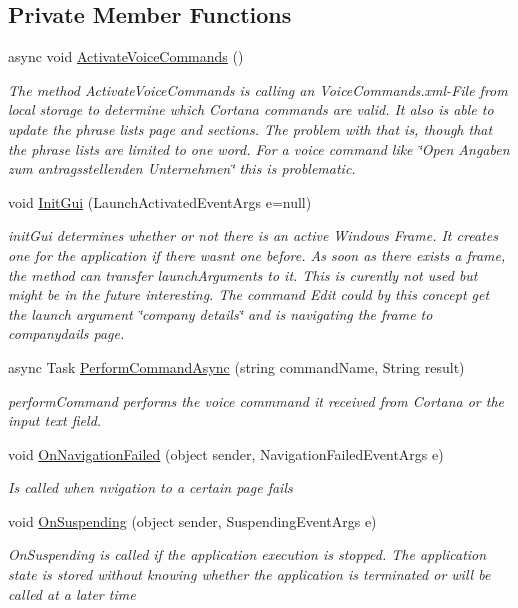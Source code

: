 \subsection*{Private Member Functions}
\begin{DoxyCompactItemize}
\item 
async void \mbox{\hyperlink{class_listen_to_me_1_1_app_ac79758b58c56c49b87a3e2ff6a9ad638}{Activate\+Voice\+Commands}} ()
\begin{DoxyCompactList}\small\item\em The method Activate\+Voice\+Commands is calling an Voice\+Commands.\+xml-\/\+File from local storage to determine which Cortana commands are valid. It also is able to update the phrase lists page and sections. The problem with that is, though that the phrase lists are limited to one word. For a voice command like \char`\"{}\+Open \textquotesingle{}\+Angaben zum antragsstellenden Unternehmen\textquotesingle{}\char`\"{} this is problematic. \end{DoxyCompactList}\item 
void \mbox{\hyperlink{class_listen_to_me_1_1_app_a4a8894ffc0736b646470c2a8ad6fca0d}{Init\+Gui}} (Launch\+Activated\+Event\+Args e=null)
\begin{DoxyCompactList}\small\item\em init\+Gui determines whether or not there is an active Windows Frame. It creates one for the application if there wasn\textquotesingle{}t one before. As soon as there exists a frame, the method can transfer launch\+Arguments to it. This is curently not used but might be in the future interesting. The command Edit could by this concept get the launch argument \char`\"{}company details\char`\"{} and is navigating the frame to companydails page. \end{DoxyCompactList}\item 
async Task \mbox{\hyperlink{class_listen_to_me_1_1_app_aaf710baa7ee4fb8e6da7e97a333e6e8c}{Perform\+Command\+Async}} (string command\+Name, String result)
\begin{DoxyCompactList}\small\item\em perform\+Command performs the voice commmand it received from Cortana or the input text field. \end{DoxyCompactList}\item 
void \mbox{\hyperlink{class_listen_to_me_1_1_app_a8867647372e101bdd100a68eab4d0d3a}{On\+Navigation\+Failed}} (object sender, Navigation\+Failed\+Event\+Args e)
\begin{DoxyCompactList}\small\item\em Is called when nvigation to a certain page fails \end{DoxyCompactList}\item 
void \mbox{\hyperlink{class_listen_to_me_1_1_app_adc9d18402a7a696ca6d4a7631a610e8d}{On\+Suspending}} (object sender, Suspending\+Event\+Args e)
\begin{DoxyCompactList}\small\item\em On\+Suspending is called if the application execution is stopped. The application state is stored without knowing whether the application is terminated or will be called at a later time \end{DoxyCompactList}\end{DoxyCompactItemize}
